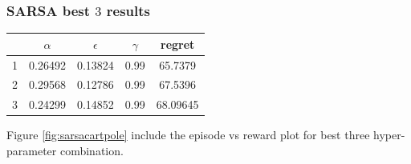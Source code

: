 \documentclass[11pt, a4]{article}
\begin{document}
			\subsubsection{SARSA best $3$ results}
				\begin{center}
					\begin{tabular}{|c|c|c|c|c|}
						\hline
						& $\alpha$ & $\epsilon$ & $\gamma$ & regret\\
						\hline
						1 & 0.26492  & 0.13824 & 0.99 & 65.7379\\
						\hline
						2 & 0.29568 & 0.12786 & 0.99 & 67.5396\\
						\hline
						3 & 0.24299 & 0.14852 & 0.99 & 68.09645\\
						\hline
					\end{tabular}					
				\end{center}
				Figure \ref{fig:sarsacartpole} include the episode vs reward plot for best three hyper-parameter combination.
\end{document}
